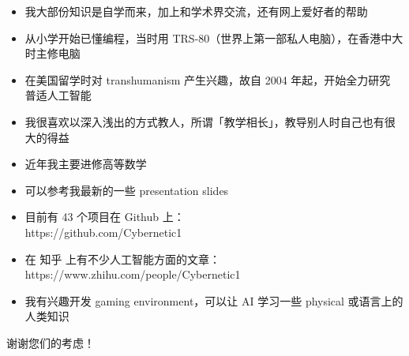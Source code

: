 \documentclass[10pt,a4paper]{altacv}
\begin{document}

\begin{fullwidth}
\makecvheader
\end{fullwidth}





\begin{itemize}
\item 我大部份知识是自学而来，加上和学术界交流，还有网上爱好者的帮助
\item 从小学开始已懂编程，当时用 TRS-80（世界上第一部私人电脑），在香港中大时主修电脑
\item 在美国留学时对 transhumanism 产生兴趣，故自 2004 年起，开始全力研究 普适人工智能
\item 我很喜欢以深入浅出的方式教人，所谓「教学相长」，教导别人时自己也有很大的得益
\item 近年我主要进修高等数学
\item 可以参考我最新的一些 presentation slides
\item 目前有 43 个项目在 Github 上： \\
	{\footnotesize https://github.com/Cybernetic1}
\item 在 知乎 上有不少人工智能方面的文章： \\
	{\footnotesize https://www.zhihu.com/people/Cybernetic1}
\item 我有兴趣开发 gaming environment，可以让 AI 学习一些 physical 或语言上的人类知识
\end{itemize}
谢谢您们的考虑！
\end{document}
